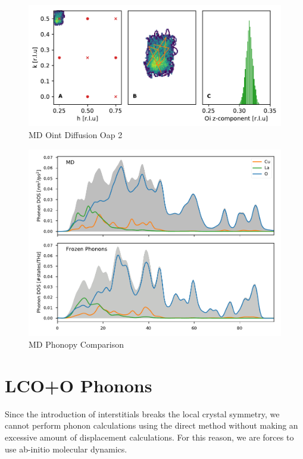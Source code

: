 \begin{figure}
	\centering
	\includegraphics[width=\textwidth]{fig/md/diffusion3.pdf}
	\caption[MD Oint Diffusion Oap 2]{MD Oint Diffusion Oap 2}
	\label{fig:md_diffusion3}
\end{figure}


\begin{figure}
	\centering
	\includegraphics[width=\textwidth]{fig/md/md_phonopy_comparison.pdf}
	\caption[MD Phonopy Comparison]{MD Phonopy Comparison}
	\label{fig:md_phonopy_comparison}
\end{figure}

\section{LCO+O Phonons}
Since the introduction of interstitials breaks the local crystal symmetry, we cannot perform phonon calculations using the direct method without making an excessive amount of displacement calculations. For this reason, we are forces to use ab-initio molecular dynamics.

